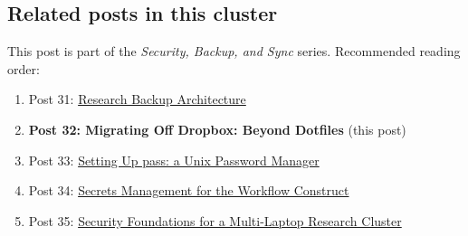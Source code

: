 \documentclass[
  11pt,
  letterpaper,
  DIV=11,
  numbers=noendperiod]{scrartcl}
\providecommand{\tightlist}{%
  \setlength{\itemsep}{0pt}\setlength{\parskip}{0pt}}\usepackage{longtable,booktabs,array}
\begin{document}
\subsection{Related posts in this
cluster}\label{related-posts-in-this-cluster}

This post is part of the \emph{Security, Backup, and Sync} series.
Recommended reading order:

\begin{enumerate}
\def\labelenumi{\arabic{enumi}.}
\tightlist
\item
  Post 31: \href{../31-sec-three-tier-backup-architecture/}{Research
  Backup Architecture}
\item
  \textbf{Post 32: Migrating Off Dropbox: Beyond Dotfiles} (this post)
\item
  Post 33: \href{../33-sec-pass-password-manager/}{Setting Up pass: a
  Unix Password Manager}
\item
  Post 34: \href{../34-sec-aws-and-pass-secrets/}{Secrets Management for
  the Workflow Construct}
\item
  Post 35: \href{../35-sec-multi-laptop-threat-model/}{Security
  Foundations for a Multi-Laptop Research Cluster}
\end{enumerate}
\end{document}
